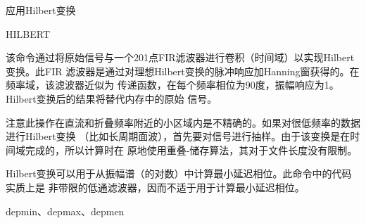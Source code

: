\label{cmd:hilbert}

应用Hilbert变换

\begin{SACSTX}
HILBERT
\end{SACSTX}

该命令通过将原始信号与一个201点FIR滤波器进行卷积（时间域）以实现Hilbert变换。此FIR
滤波器是通过对理想Hilbert变换的脉冲响应加Hanning窗获得的。在频率域，该滤波器近似为
传递函数，在每个频率相位为90度，振幅响应为1。Hilbert变换后的结果将替代内存中的原始
信号。

注意此操作在直流和折叠频率附近的小区域内是不精确的。如果对很低频率的数据进行Hilbert变换
（比如长周期面波），首先要对信号进行抽样。由于该变换是在时间域完成的，所以计算时在
原地使用重叠-储存算法，其对于文件长度没有限制。

Hilbert变换可以用于从振幅谱（的对数）中计算最小延迟相位。此命令中的代码实质上是
非带限的低通滤波器，因而不适于用于计算最小延迟相位。

depmin、depmax、depmen
